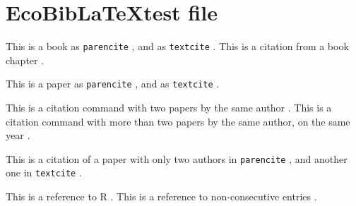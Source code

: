 \documentclass[12pt]{article}
\begin{document}
\doublespacing
 
\section*{EcoBib\LaTeX test file}

This is a book as \texttt{parencite} \parencite{Darwin1859}, and as \texttt{textcite}
\textcite{Elton1927}. This is a citation from a book chapter \parencite{Dunne2006}.

This is a paper as \texttt{parencite} \parencite{Holt1996}, and as \texttt{textcite}
\textcite{Anderson2011}.

This is a citation command with two papers by the same author \parencite{Tuomisto2010,Tuomisto2011}.
This is a citation command with more than two papers by the same author, on the same year
\parencite{Frank1993,Frank1993a,Frank1993b}.

This is a citation of a paper with only two authors in \texttt{parencite}
\parencite{PoisotBJLS2010}, and another one in \texttt{textcite} \textcite{Yang2012}.

This is a reference to R \parencite{R-Development-Core-Team2008}. This is a reference to
non-consecutive entries \parencite{Yang2012,Dunne2006,Frank1993,Frank1993a,Frank1993b}.

\printbibliography
\end{document}
